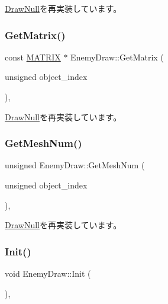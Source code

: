 \mbox{\hyperlink{class_draw_null_a84969d22d3436986f214e9896fe44fc6}{Draw\+Null}}を再実装しています。

\mbox{\label{class_enemy_draw_a6f2a052a45caf0d255112cbe81b8bfa3}} 
\subsubsection{\texorpdfstring{Get\+Matrix()}{GetMatrix()}}
{\footnotesize\ttfamily const \mbox{\hyperlink{_vector3_d_8h_a032295cd9fb1b711757c90667278e744}{M\+A\+T\+R\+IX}} $\ast$ Enemy\+Draw\+::\+Get\+Matrix (\begin{DoxyParamCaption}\item[{unsigned}]{object\+\_\+index }\end{DoxyParamCaption})\hspace{0.3cm}{\ttfamily [override]}, {\ttfamily [virtual]}}



\mbox{\hyperlink{class_draw_null_adede079e9c11a756090740b20bb43022}{Draw\+Null}}を再実装しています。

\mbox{\label{class_enemy_draw_acda1a2487aea432b08fc816351a12239}} 
\subsubsection{\texorpdfstring{Get\+Mesh\+Num()}{GetMeshNum()}}
{\footnotesize\ttfamily unsigned Enemy\+Draw\+::\+Get\+Mesh\+Num (\begin{DoxyParamCaption}\item[{unsigned}]{object\+\_\+index }\end{DoxyParamCaption})\hspace{0.3cm}{\ttfamily [override]}, {\ttfamily [virtual]}}



\mbox{\hyperlink{class_draw_null_ad735978a85a5f3583eecd82d6bfe6413}{Draw\+Null}}を再実装しています。

\mbox{\label{class_enemy_draw_aa1659c35fa757db6a6cf07e26ad9ddfb}} 
\subsubsection{\texorpdfstring{Init()}{Init()}}
{\footnotesize\ttfamily void Enemy\+Draw\+::\+Init (\begin{DoxyParamCaption}{ }\end{DoxyParamCaption})\hspace{0.3cm}{\ttfamily [override]}, {\ttfamily [virtual]}}



